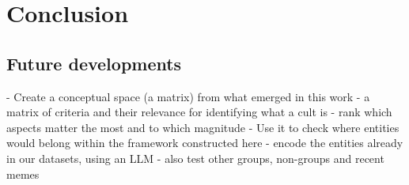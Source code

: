 \chapter{Conclusion}
\label{ch:conclusion}


\section{Future developments}
\label{sec:future_developments}

- Create a conceptual space (a matrix) from what emerged in this work
    - a matrix of criteria and their relevance for identifying what a cult is
    - rank which aspects matter the most and to which magnitude
- Use it to check where entities would belong within the framework constructed here
    - encode the entities already in our datasets, using an LLM
    - also test other groups, non-groups and recent memes
